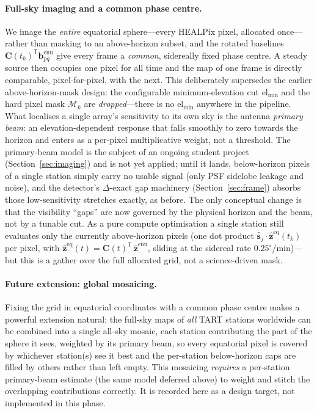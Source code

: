 \documentclass[11pt]{article}
\newcommand{\T}{^{\mathsf{T}}}
\begin{document}
\paragraph{Full-sky imaging and a common phase centre.} We image the \emph{entire} equatorial
sphere---every HEALPix pixel, allocated once---rather than masking to an above-horizon subset, and
the rotated baselines $\bm{C}(t_k)\T\bm{b}^{\mathrm{enu}}_{pq}$ give every frame a \emph{common},
sidereally fixed phase centre. A steady source then occupies one pixel for all time and the map of
one frame is directly comparable, pixel-for-pixel, with the next. This deliberately supersedes the
earlier above-horizon-mask design: the configurable minimum-elevation cut $\mathrm{el}_{\min}$ and
the hard pixel mask $\mathcal{M}_k$ are \emph{dropped}---there is no $\mathrm{el}_{\min}$ anywhere in
the pipeline. What localises a single array's sensitivity to its own sky is the antenna
\emph{primary beam}: an elevation-dependent response that falls smoothly to zero towards the horizon
and enters as a per-pixel multiplicative weight, not a threshold. The primary-beam model is the
subject of an ongoing student project (Section~\ref{sec:imaging}) and is not yet applied; until it
lands, below-horizon pixels of a single station simply carry no usable signal (only PSF sidelobe
leakage and noise), and the detector's $\Delta$-exact gap machinery (Section~\ref{sec:frame})
absorbs those low-sensitivity stretches exactly, as before. The only conceptual change is that the
visibility ``gaps'' are now governed by the physical horizon and the beam, not by a tunable cut. As
a pure compute optimisation a single station still evaluates only the currently above-horizon pixels
(one dot product $\hat{\bm{s}}_j\cdot\hat{\bm{z}}^{\mathrm{eq}}(t_k)$ per pixel, with
$\hat{\bm{z}}^{\mathrm{eq}}(t)=\bm{C}(t)\T\,\hat{\bm{z}}^{\mathrm{enu}}$, sliding at the sidereal rate
$0.25^\circ$/min)---but this is a gather over the full allocated grid, not a science-driven mask.

\paragraph{Future extension: global mosaicing.} Fixing the grid in equatorial coordinates with a
common phase centre makes a powerful extension natural: the full-sky maps of \emph{all} TART
stations worldwide can be combined into a single all-sky mosaic, each station contributing the part
of the sphere it sees, weighted by its primary beam, so every equatorial pixel is covered by
whichever station(s) see it best and the per-station below-horizon caps are filled by others rather
than left empty. This mosaicing \emph{requires} a per-station primary-beam estimate (the same model
deferred above) to weight and stitch the overlapping contributions correctly. It is recorded here as
a design target, not implemented in this phase.
\end{document}
